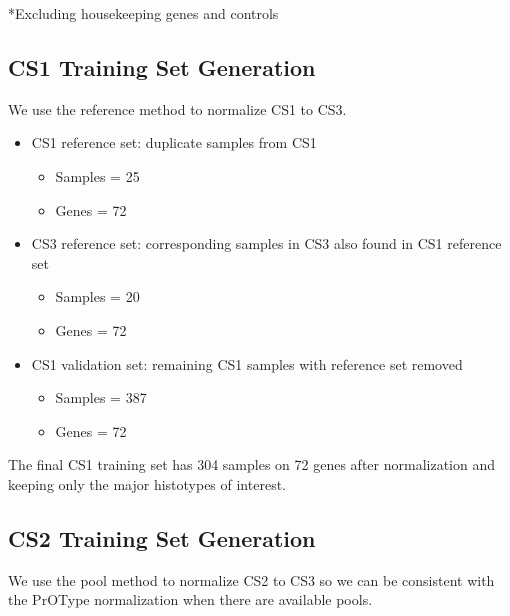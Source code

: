 \documentclass[
]{report}
\providecommand{\tightlist}{%
  \setlength{\itemsep}{0pt}\setlength{\parskip}{0pt}}
\begin{document}
*Excluding housekeeping genes and controls

\hypertarget{cs1-training-set-generation}{%
\subsection{CS1 Training Set Generation}\label{cs1-training-set-generation}}

We use the reference method to normalize CS1 to CS3.

\begin{itemize}
\item
  CS1 reference set: duplicate samples from CS1

  \begin{itemize}
  \tightlist
  \item
    Samples = 25
  \item
    Genes = 72
  \end{itemize}
\item
  CS3 reference set: corresponding samples in CS3 also found in CS1 reference set

  \begin{itemize}
  \tightlist
  \item
    Samples = 20
  \item
    Genes = 72
  \end{itemize}
\item
  CS1 validation set: remaining CS1 samples with reference set removed

  \begin{itemize}
  \tightlist
  \item
    Samples = 387
  \item
    Genes = 72
  \end{itemize}
\end{itemize}

The final CS1 training set has 304 samples on 72 genes after normalization and keeping only the major histotypes of interest.

\hypertarget{cs2-training-set-generation}{%
\subsection{CS2 Training Set Generation}\label{cs2-training-set-generation}}

We use the pool method to normalize CS2 to CS3 so we can be consistent with the PrOType normalization when there are available pools.
\end{document}
